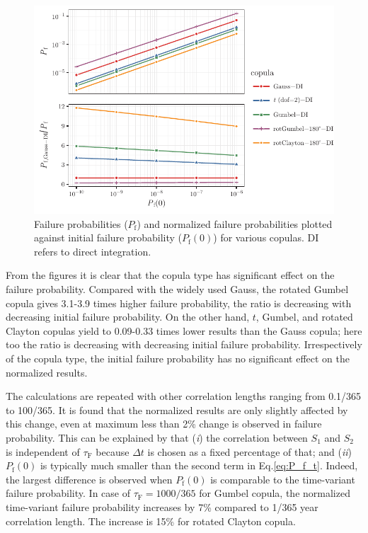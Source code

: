 \begin{figure}[htbp!] 
	\centering    
	\includegraphics[]{simple_example_Pf.pdf}
	\caption{Failure probabilities ($P_\mathrm{f}$) and normalized failure probabilities plotted against initial failure probability ($P_\mathrm{f}(0)$) for various copulas. DI refers to direct integration.}
	\label{fig:pf_ex1}
\end{figure}

From the figures it is clear that the copula type has significant effect on the failure probability. Compared with the widely used Gauss, the rotated Gumbel copula gives 3.1-3.9 times higher failure probability, the ratio is decreasing with decreasing initial failure probability. On the other hand, $t$, Gumbel, and rotated Clayton copulas yield to 0.09-0.33 times lower results than the Gauss copula; here too the ratio is decreasing with decreasing initial failure probability. Irrespectively of the copula type, the initial failure probability has no significant effect on the normalized results.

The calculations are repeated with other correlation lengths ranging from 0.1/365 to 100/365. It is found that the normalized results are only slightly affected by this change, even at maximum less than 2\% change is observed in failure probability. This can be explained by that (\textit{i}) the correlation between $S_1$ and $S_2$ is independent of $\tau_\mathrm{F}$ because $\Delta t$ is chosen as a fixed percentage of that; and (\textit{ii}) $P_\mathrm{f}(0)$ is typically much smaller than the second term in Eq.\ref{eq:P_f_t}. Indeed, the largest difference is observed when $P_\mathrm{f}(0)$ is comparable to the time-variant failure probability. In case of $\tau _\mathrm{F} = 1000/365$ for Gumbel copula, the normalized time-variant failure probability increases by 7\% compared to 1/365 year correlation length. The increase is 15\% for rotated Clayton copula.

